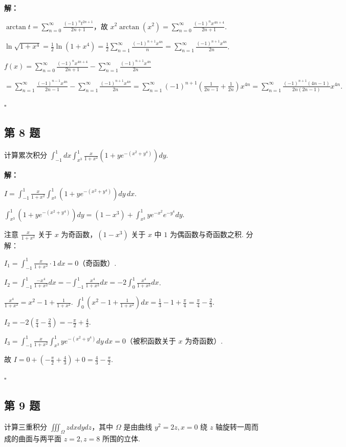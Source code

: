 \documentclass[12pt,a4paper]{article}
\newenvironment{sol}[1][解]{%
  \par\medskip\noindent\textbf{#1：}\itshape\par\noindent\ignorespaces
}{%
  \par\hfill$\square$\par\medskip
}
\begin{document}
\begin{sol}$\arctan
  t=\sum_{n=0}^{\infty}\frac{(-1)^nt^{2n+1}}{2n+1}$，故
  $x^2\arctan(x^2)=\sum_{n=0}^{\infty}\frac{(-1)^nx^{4n+4}}{2n+1}$.

  $\ln\sqrt{1+x^4}=\frac{1}{2}\ln(1+x^4)=\frac{1}{2}\sum_{n=1}^{\infty}\frac{(-1)^{n+1}x^{4n}}{n}=\sum_{n=1}^{\infty}\frac{(-1)^{n+1}x^{4n}}{2n}$.

  $f(x)=\sum_{n=0}^{\infty}\frac{(-1)^nx^{4n+4}}{2n+1}-\sum_{n=1}^{\infty}\frac{(-1)^{n+1}x^{4n}}{2n}$

  $=\sum_{n=1}^{\infty}\frac{(-1)^{n-1}x^{4n}}{2n-1}-\sum_{n=1}^{\infty}\frac{(-1)^{n+1}x^{4n}}{2n}=\sum_{n=1}^{\infty}(-1)^{n+1}\left(\frac{1}{2n-1}+\frac{1}{2n}\right)x^{4n}=\sum_{n=1}^{\infty}\frac{(-1)^{n+1}(4n-1)}{2n(2n-1)}x^{4n}.$

\end{sol}
\subsection*{第 8 题}
计算累次积分
$\int_{-1}^{1}dx\int_{x^3}^{1}\frac{x}{1+x^2}\left(1+ye^{-(x^2+y^4)}\right)dy$.

\begin{sol}$I=\int_{-1}^1\frac{x}{1+x^2}\int_{x^3}^1(1+ye^{-(x^2+y^4)})dy\,dx$.

  $\int_{x^3}^1(1+ye^{-(x^2+y^4)})dy=(1-x^3)+\int_{x^3}^1ye^{-x^2}e^{-y^4}dy$.

  注意 $\frac{x}{1+x^2}$ 关于 $x$ 为奇函数，$(1-x^3)$ 关于 $x$ 中 $1$ 为偶函数与奇函数之积. 分解：

  $I_1=\int_{-1}^1\frac{x}{1+x^2}\cdot 1\,dx=0$（奇函数）.

  $I_2=\int_{-1}^1\frac{-x^4}{1+x^2}dx=-\int_{-1}^1\frac{x^4}{1+x^2}dx=-2\int_0^1\frac{x^4}{1+x^2}dx$.

  $\frac{x^4}{1+x^2}=x^2-1+\frac{1}{1+x^2}$.
  $\int_0^1(x^2-1+\frac{1}{1+x^2})dx=\frac{1}{3}-1+\frac{\pi}{4}=\frac{\pi}{4}-\frac{2}{3}$.

  $I_2=-2(\frac{\pi}{4}-\frac{2}{3})=-\frac{\pi}{2}+\frac{4}{3}$.

  $I_3=\int_{-1}^1\frac{x}{1+x^2}\int_{x^3}^1ye^{-(x^2+y^4)}dy\,dx=0$（被积函数关于
  $x$ 为奇函数）.

  故 $I=0+(-\frac{\pi}{2}+\frac{4}{3})+0=\frac{4}{3}-\frac{\pi}{2}.$

\end{sol}
\subsection*{第 9 题}
计算三重积分 $\iiint_{\Omega}zdxdydz$，其中 $\Omega$ 是由曲线 $y^2=2z, x=0$ 绕 $z$
轴旋转一周而成的曲面与两平面 $z=2, z=8$ 所围的立体.
\end{document}
